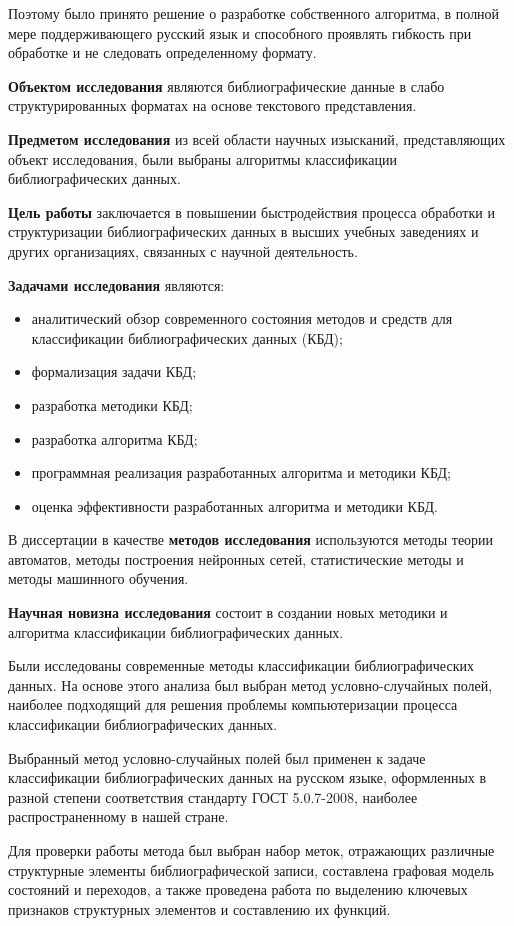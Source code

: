 Поэтому было принято решение о разработке собственного алгоритма, в полной мере поддерживающего русский язык и способного проявлять гибкость при обработке и не следовать определенному формату.

\textbf{Объектом исследования} являются библиографические данные в слабо структурированных форматах на основе текстового представления.

\textbf{Предметом исследования} из всей области научных изысканий, представляющих объект исследования, были выбраны алгоритмы классификации библиографических данных.

\textbf{Цель работы} заключается в повышении быстродействия процесса обработки и структуризации библиографических данных в высших учебных заведениях и других организациях, связанных с научной деятельность.

\textbf{Задачами исследования} являются:
\begin{itemize}
	\item аналитический обзор современного состояния методов и средств для классификации библиографических данных (КБД);
	\item формализация задачи КБД;
	\item разработка методики КБД;
	\item разработка алгоритма КБД;
	\item программная реализация разработанных алгоритма и методики КБД;
	\item оценка эффективности разработанных алгоритма и методики КБД.
\end{itemize}

В диссертации в качестве \textbf{методов исследования} используются методы теории автоматов, методы построения нейронных сетей, статистические методы и методы машинного обучения.

\textbf{Научная новизна исследования} состоит в создании новых методики и алгоритма классификации библиографических данных.

Были исследованы современные методы классификации библиографических данных. На основе этого анализа был выбран метод условно-случайных полей, наиболее подходящий для решения проблемы компьютеризации процесса классификации библиографических данных.

Выбранный метод условно-случайных полей был применен к задаче классификации библиографических данных на русском языке, оформленных в разной степени соответствия стандарту ГОСТ 5.0.7-2008, наиболее распространенному в нашей стране.

Для проверки работы метода был выбран набор меток, отражающих различные структурные элементы библиографической записи, составлена графовая модель состояний и переходов, а также проведена работа по выделению ключевых признаков структурных элементов и составлению их функций.

